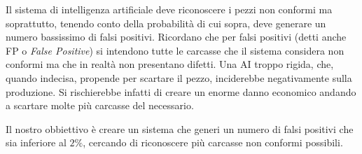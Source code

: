 Il sistema di intelligenza artificiale deve riconoscere i pezzi non conformi ma soprattutto, tenendo conto della probabilità di cui sopra, deve generare un numero bassissimo di falsi positivi.
Ricordano che per falsi positivi (detti anche FP o \textit{False Positive}) si intendono tutte le carcasse che il sistema considera non conformi ma che in realtà non presentano difetti.
Una AI troppo rigida, che, quando indecisa, propende per scartare il pezzo, inciderebbe negativamente sulla produzione.
Si rischierebbe infatti di creare un enorme danno economico andando a scartare molte più carcasse del necessario.

Il nostro obbiettivo è creare un sistema che generi un numero di falsi positivi che sia inferiore al $2\%$, cercando di riconoscere più carcasse non conformi possibili.





